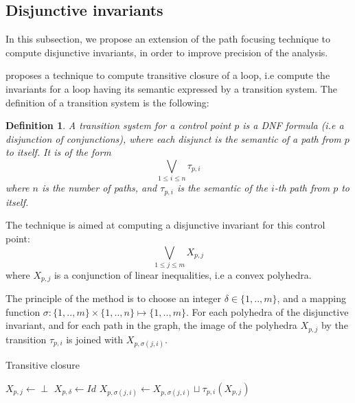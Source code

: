 \documentclass[a4paper,english,titlepage,11pt]{report}
\newtheorem{definition}{Definition}[section]
\begin{document}

	\subsection{Disjunctive invariants}

	In this subsection, we propose an extension of the path focusing technique
	to compute disjunctive invariants, in order to improve precision of the
	analysis.

	\cite{GulwaniZ10} proposes a technique to compute transitive closure of a
	loop, i.e compute the invariants for a loop having its semantic
	expressed by a transition system. The definition of a transition system is
	the following:

	\begin{definition}
	A transition system for a control point $p$ is a DNF formula (i.e a
	disjunction of conjunctions), where each
	disjunct is the semantic of a path from $p$ to itself. It is of the form
	$$\bigvee_{1 \leq i \leq n} \tau_{p,i}$$ where $n$ is the number of
	paths, and $\tau_{p,i}$ is the semantic of the $i$-th path from $p$ to
	itself.
	\end{definition}

	The technique is aimed at computing a disjunctive invariant for this control
	point: 
	$$\displaystyle\bigvee_{1 \leq j \leq m} X_{p,j}$$
	where $X_{p,j}$ is a conjunction of linear inequalities, i.e a convex
	polyhedra.

	The principle of the method is to
	choose an integer $\delta \in \{1,..,m\}$, and a mapping function
	$\sigma: \{1,..,m\} \times \{1,..,n\} \mapsto \{1,..,m\}$.
	For each polyhedra of the disjunctive invariant, and for each path in the
	graph, the image of the polyhedra $X_{p,j}$ by the transition
	$\tau_{p,i}$ is joined with $X_{p,\sigma(j,i)}$.

\begin{algorithm}
\caption{Transitive closure}\label{gulwani}
\begin{algorithmic}[1] 
	\State $X_{p,j} \gets \perp$
\EndFor
\State $X_{p,\delta} \gets Id$
\Repeat
		\State $X_{p,\sigma(j,i)} \gets X_{p,\sigma(j,i)} \sqcup
		\tau_{p,i}(X_{p,j})$
	\EndFor
{}
\EndProcedure
\end{algorithmic}
\end{algorithm}
\end{document}
